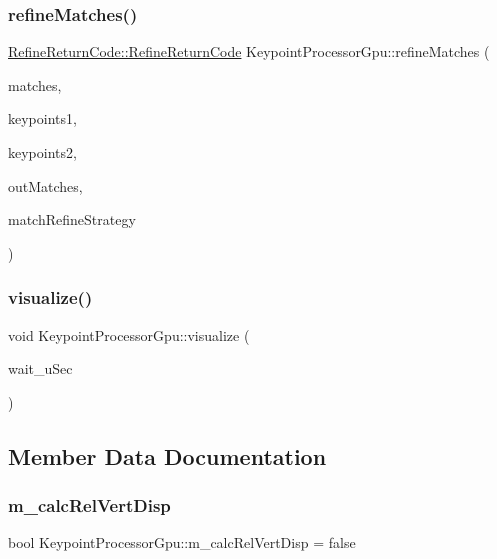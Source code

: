 \subsubsection{\texorpdfstring{refine\+Matches()}{refineMatches()}}
{\footnotesize\ttfamily \hyperlink{namespaceRefineReturnCode_a54e2cd5f4af90ff2df55bf63455d1959}{Refine\+Return\+Code\+::\+Refine\+Return\+Code} Keypoint\+Processor\+Gpu\+::refine\+Matches (\begin{DoxyParamCaption}\item[{const std\+::vector$<$ cv\+::\+D\+Match $>$ \&}]{matches,  }\item[{std\+::vector$<$ cv\+::\+Key\+Point $>$ \&}]{keypoints1,  }\item[{std\+::vector$<$ cv\+::\+Key\+Point $>$ \&}]{keypoints2,  }\item[{std\+::vector$<$ cv\+::\+D\+Match $>$ \&}]{out\+Matches,  }\item[{std\+::string}]{match\+Refine\+Strategy }\end{DoxyParamCaption})}

\mbox{\label{classKeypointProcessorGpu_a192bc98425b2bc0bea56ae024d9584b3}} 
\subsubsection{\texorpdfstring{visualize()}{visualize()}}
{\footnotesize\ttfamily void Keypoint\+Processor\+Gpu\+::visualize (\begin{DoxyParamCaption}\item[{double}]{wait\+\_\+u\+Sec }\end{DoxyParamCaption})}



\subsection{Member Data Documentation}
\mbox{\label{classKeypointProcessorGpu_a042507c38ba05d0987aef504de3b4542}} 
\subsubsection{\texorpdfstring{m\+\_\+calc\+Rel\+Vert\+Disp}{m\_calcRelVertDisp}}
{\footnotesize\ttfamily bool Keypoint\+Processor\+Gpu\+::m\+\_\+calc\+Rel\+Vert\+Disp = false\hspace{0.3cm}{\ttfamily [private]}}

